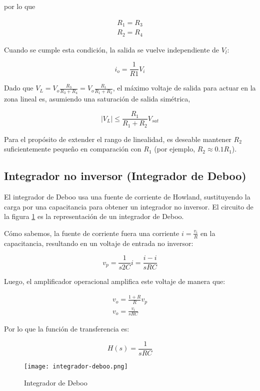 por lo que 

\begin{align}
    \boxed{R_1 = R_3} \\
    \boxed{R_2 = R_4} 
\end{align}

Cuando se cumple esta condición, la salida se vuelve independiente de $V_l$:

\begin{equation}
    \boxed{i_o = \frac{1}{R1} V_i}
    \label{eq:mt-io-fuente-corriente}
\end{equation}

Dado que $V_L = V_o \frac{R_3}{R_3 + R_4} = V_o \frac{R_1}{R_1 + R_2}$, el máximo  voltaje de salida para actuar en la zona lineal es, asumiendo una saturación de salida simétrica,  

\begin{equation}
    \left| V_L \right| \leq  \frac{R_1}{R_1 + R_2} V_{sat}
\end{equation}

Para el propósito de extender el rango de linealidad, es deseable mantener $R_2$ suficientemente pequeño en comparación	con $R_1$ (por ejemplo, $R_2 \approx 0.1 R_1$).

\subsection{Integrador no inversor (Integrador de Deboo)}

El integrador de Deboo usa una fuente de corriente de Howland, sustituyendo la carga por una capacitancia para obtener un integrador no inversor. El circuito de la figura \ref{fig:mt-integrador-deboo} es la representación de un integrador de Deboo.

Cómo sabemos, la fuente de corriente fuera una corriente $i = \frac{v_i}{R}$ en la capacitancia, resultando en un voltaje de entrada no inversor:

\begin{equation*}
    v_p = \frac{1}{s2C} i = \frac{i-i}{sRC}
\end{equation*}

Luego, el amplificador operacional amplifica este voltaje de manera que:

\begin{align*}
    v_o = \frac{1 + R}{R} v_p \\
    v_o = \frac{v_i}{sRC}
\end{align*}

Por lo que la función de transferencia es: 

\begin{equation}
    H(s) = \frac{1}{sRC}
    \label{eq:mt-func-transferencia-integrador-deboo}
\end{equation}

\begin{figure}[ht]
    \centering
    \texttt{[image: integrador-deboo.png]}
    \caption{Integrador de Deboo}
    \label{fig:mt-integrador-deboo}
\end{figure}

